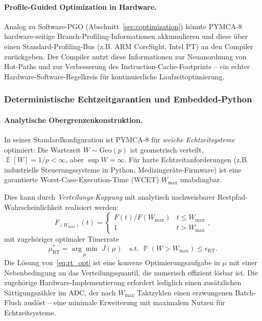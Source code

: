 ﻿\documentclass[a4paper,12pt]{scrreprt}
\theoremstyle{definition}
\DeclareMathOperator{\E}{\mathbb{E}}
\DeclareMathOperator{\Prob}{\mathbb{P}}
\begin{document}
	\paragraph{Profile-Guided Optimization in Hardware.}
	Analog zu Software-PGO (Abschnitt~\ref{sec:coptimization}) könnte PYMCA-8
	hardware-seitige Branch-Profiling-Informationen akkumulieren und diese über
	einen Standard-Profiling-Bus (z.B. ARM CoreSight, Intel PT) an den Compiler
	zurückgeben. Der Compiler nutzt diese Informationen zur Neuanordnung von
	Hot-Paths und zur Verbesserung des Instruction-Cache-Footprints -- ein
	echter Hardware-Software-Regelkreis für kontinuierliche Laufzeitoptimierung.

	\subsubsection{Deterministische Echtzeitgarantien und Embedded-Python}

	\paragraph{Analytische Obergrenzenkonstruktion.}
	In seiner Standardkonfiguration ist PYMCA-8 für \emph{weiche Echtzeitsysteme}
	optimiert: Die Wartezeit $W \sim \mathrm{Geo}(p)$ ist geometrisch verteilt,
	$\E[W] = 1/p < \infty$, aber $\sup W = \infty$. Für harte Echtzeitanforderungen
	(z.B. industrielle Steuerungssysteme in Python, Medizingeräte-Firmware)
	ist eine garantierte Worst-Case-Execution-Time (WCET) $W_{\max}$ unabdingbar.

	Dies kann durch \emph{Verteilungs-Kappung} mit analytisch nachweisbarer Restpfad-Wahrschein\-lichkeit realisiert werden:
	\begin{equation}
		F_{(W_{\max})}(t) =
		\begin{cases} F(t) / F(W_{\max}) & t \le W_{\max} \\ 1 & t > W_{\max} \end{cases},
		\label{eq:capped_dist}
	\end{equation}
	mit zugehöriger optimaler Timerrate
	\begin{equation}
		\mu_{\mathrm{RT}}^* = \underset{\mu}{\arg\min}\; J(\mu)
		\quad \text{s.t. } \Prob(W > W_{\max}) \le \epsilon_{\mathrm{RT}}.
		\label{eq:rt_opt}
	\end{equation}
	Die Lösung von~\eqref{eq:rt_opt} ist eine konvexe Optimierungsaufgabe in
	$\mu$ mit einer Nebenbedingung an das Verteilungsquantil, die numerisch
	effizient lösbar ist. Die zugehörige Hardware-Implementierung erfordert lediglich
	einen zusätzlichen Sättigungszähler im ADC, der nach $W_{\max}$ Taktzyklen
	einen erzwungenen Batch-Flush auslöst -- eine minimale Erweiterung mit
	maximalem Nutzen für Echtzeitsysteme.
\end{document}
